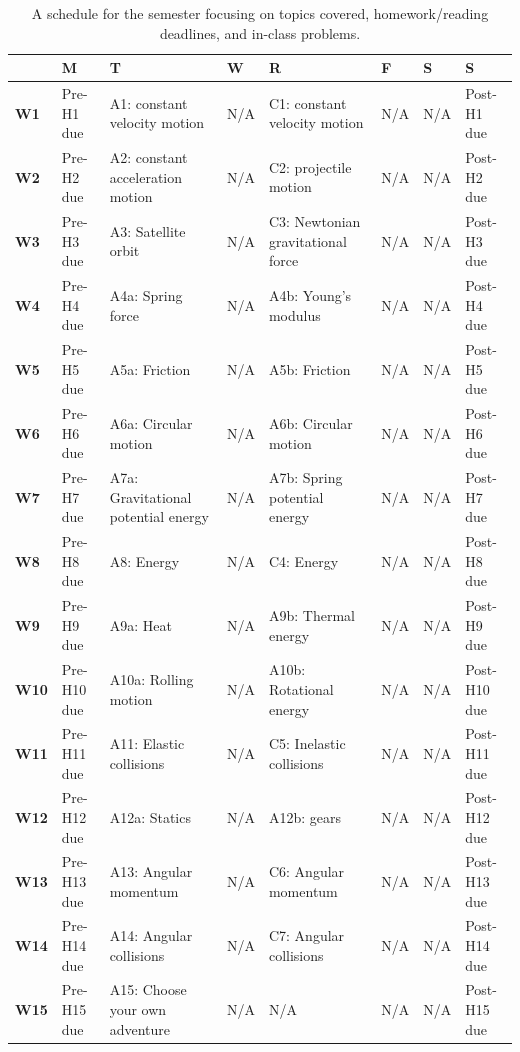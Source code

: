 \documentclass{msuphddissertation}
\begin{document}
\begin{doublespace}
\begin{table}[t]\tiny
\begin{tabular}{|l|l|l|l|l|l|l|l|}\hline
   & \textbf M & \textbf T & \textbf W & \textbf R & \textbf F & \textbf S & \textbf S \\\hline
\textbf{W1} & Pre-H1 due & A1: constant velocity motion & N/A & C1: constant velocity motion & N/A & N/A & Post-H1 due \\\hline
\textbf{W2} & Pre-H2 due & A2: constant acceleration motion & N/A & C2: projectile motion & N/A & N/A & Post-H2 due \\\hline
\textbf{W3} & Pre-H3 due & A3: Satellite orbit & N/A & C3: Newtonian gravitational force & N/A & N/A & Post-H3 due \\\hline
\textbf{W4} & Pre-H4 due & A4a: Spring force & N/A & A4b: Young's modulus & N/A & N/A & Post-H4 due \\\hline
\textbf{W5} & Pre-H5 due & A5a: Friction & N/A & A5b: Friction & N/A & N/A & Post-H5 due \\\hline
\textbf{W6} & Pre-H6 due & A6a: Circular motion & N/A & A6b: Circular motion & N/A & N/A & Post-H6 due \\\hline
\textbf{W7} & Pre-H7 due & A7a: Gravitational potential energy & N/A & A7b: Spring potential energy & N/A & N/A & Post-H7 due \\\hline
\textbf{W8} & Pre-H8 due & A8: Energy & N/A & C4: Energy & N/A & N/A & Post-H8 due \\\hline
\textbf{W9} & Pre-H9 due & A9a: Heat & N/A & A9b: Thermal energy & N/A & N/A & Post-H9 due \\\hline
\textbf{W10} & Pre-H10 due & A10a: Rolling motion & N/A & A10b: Rotational energy & N/A & N/A & Post-H10 due \\\hline
\textbf{W11} & Pre-H11 due & A11: Elastic collisions & N/A & C5: Inelastic collisions & N/A & N/A & Post-H11 due \\\hline
\textbf{W12} & Pre-H12 due & A12a: Statics & N/A & A12b: gears & N/A & N/A & Post-H12 due \\\hline
\textbf{W13} & Pre-H13 due & A13: Angular momentum & N/A & C6: Angular momentum & N/A & N/A & Post-H13 due \\\hline
\textbf{W14} & Pre-H14 due & A14: Angular collisions & N/A & C7: Angular collisions & N/A & N/A & Post-H14 due \\\hline
\textbf{W15} & Pre-H15 due & A15: Choose your own adventure & N/A & N/A & N/A & N/A & Post-H15 due \\\hline
\end{tabular}\caption{A schedule for the semester focusing on topics covered, homework/reading deadlines, and in-class problems.}\label{CH3:Schedule}
\end{table}


\end{doublespace}
\end{document}
